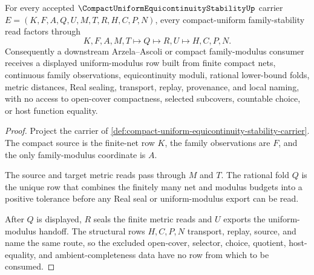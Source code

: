 \begin{theorem}\label{thm:compact-uniform-equicontinuity-stability-handoff}
For every accepted $\CompactUniformEquicontinuityStabilityUp$ carrier $E=(K,F,A,Q,U,M,T,R,H,C,P,N)$, every compact-uniform family-stability read factors through
$$
K,F,A,M,T \longmapsto Q \longmapsto R,U \longmapsto H,C,P,N .
$$
Consequently a downstream Arzela--Ascoli or compact family-modulus consumer receives a displayed uniform-modulus row built from finite compact nets, continuous family observations, equicontinuity moduli, rational lower-bound folds, metric distances, Real sealing, transport, replay, provenance, and local naming, with no access to open-cover compactness, selected subcovers, countable choice, or host function equality.
\end{theorem}
\begin{proof}
Project the carrier of \autoref{def:compact-uniform-equicontinuity-stability-carrier}. The compact source is the finite-net row $K$, the family observations are $F$, and the only family-modulus coordinate is $A$.

The source and target metric reads pass through $M$ and $T$. The rational fold $Q$ is the unique row that combines the finitely many net and modulus budgets into a positive tolerance before any Real seal or uniform-modulus export can be read.

After $Q$ is displayed, $R$ seals the finite metric reads and $U$ exports the uniform-modulus handoff. The structural rows $H,C,P,N$ transport, replay, source, and name the same route, so the excluded open-cover, selector, choice, quotient, host-equality, and ambient-completeness data have no row from which to be consumed.
\end{proof}


